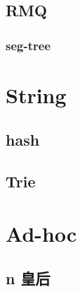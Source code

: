 \subsection{RMQ}
\subsubsection{seg-tree}


% 

\section{String}

\subsection{hash}


\subsection{Trie}


\section{Ad-hoc}

\subsection{n 皇后}
